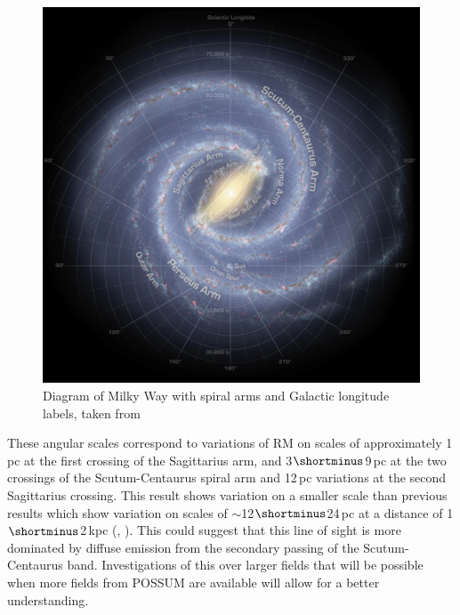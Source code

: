 \begin{figure}
    \centering
    \includegraphics[width=\linewidth]{Thesis_Template/Figures/Milky Way Map.png}
    \caption[Diagram of the Milky Way]{Diagram of Milky Way with spiral arms and Galactic longitude labels, taken from \cite{spitzer_2009}}
    \label{fig:mw map}
\end{figure}

These angular scales correspond to variations of RM on scales of approximately 1$\,$pc at the first crossing of the Sagittarius arm, and 3$\shortminus$9$\,$pc at the two crossings of the Scutum-Centaurus spiral arm and 12$\,$pc variations at the second Sagittarius crossing. This result shows variation on a smaller scale than previous results which show variation on scales of $\sim$12$\shortminus$24$\,$pc at a distance of 1$\shortminus$2$\,$kpc (\cite{vanderwoude2024prototypefaradayrotationmeasure}, \cite{Haverkorn_2006}). This could suggest that this line of sight is more dominated by diffuse emission from the secondary passing of the Scutum-Centaurus band. Investigations of this over larger fields that will be possible when more fields from POSSUM are available will allow for a better understanding. 



